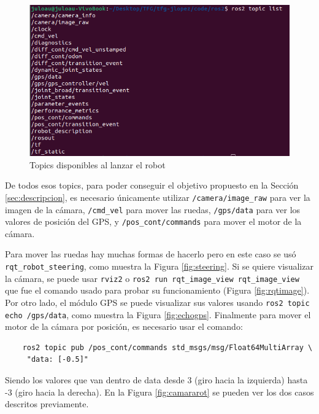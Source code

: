  \begin{figure} [h!]
	\begin{center}
		\includegraphics[width=12cm]{figs/cap6/topic.png}
	\end{center}
	\caption{Topics disponibles al lanzar el robot}
	\label{fig:topic}
\end{figure}


De todos esos topics, para poder conseguir el objetivo propuesto en la Sección \ref{sec:descripcion}, es necesario únicamente utilizar \verb|/camera/image_raw| para ver la imagen de la cámara, \verb|/cmd_vel| para mover las ruedas, \verb|/gps/data| para ver los valores de posición del \acs{GPS}, y \verb|/pos_cont/commands| para mover el motor de la cámara.

Para mover las ruedas hay muchas formas de hacerlo pero en este caso se usó \verb|rqt_robot_steering|, como muestra la Figura \ref{fig:steering}. Si se quiere visualizar la cámara, se puede usar \verb|rviz2| o \verb|ros2 run rqt_image_view rqt_image_view| que fue el comando usado para probar su funcionamiento (Figura \ref{fig:rqtimage}). Por otro lado, el módulo \acs{GPS} se puede visualizar sus valores usando \verb|ros2 topic echo /gps/data|, como muestra la Figura \ref{fig:echogps}. Finalmente para mover el motor de la cámara por posición, es necesario usar el comando: 

\begin{verbatim}
	ros2 topic pub /pos_cont/commands std_msgs/msg/Float64MultiArray \
	 "data: [-0.5]"
\end{verbatim} 

Siendo los valores que van dentro de data desde 3 (giro hacia la izquierda) hasta -3 (giro hacia la derecha). En la Figura \ref{fig:camararot} se pueden ver los dos casos descritos previamente. 


